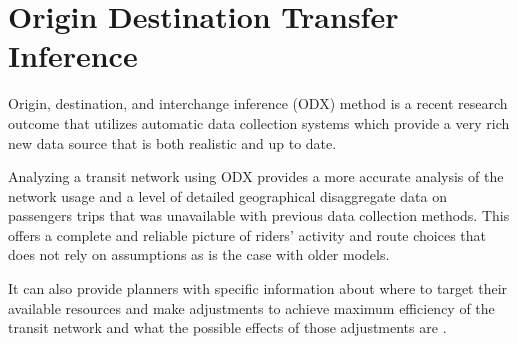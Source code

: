 \documentclass[11pt,twoside]{article}
\numberwithin{equation}{section}
\newcommand{\?}{\stackrel{?}{=}}
\begin{document}








\section{Origin Destination Transfer Inference}

Origin, destination, and interchange inference (ODX) method is a recent research outcome that utilizes automatic data collection systems which provide a very rich new data source that is both realistic and up to date. 

Analyzing a transit network using ODX provides a more accurate analysis of the network usage and a level of detailed geographical disaggregate data on passengers trips that was unavailable with previous data collection methods. This offers a complete and reliable picture of riders’ activity and route choices that does not rely on assumptions as is the case with older models.

It can also provide planners with specific information about where to target their available resources and make adjustments to achieve maximum efficiency of the transit network and what the possible effects of those adjustments are \citep{vanderwaartPlanningTransitNetworks2016}. 
\end{document}
